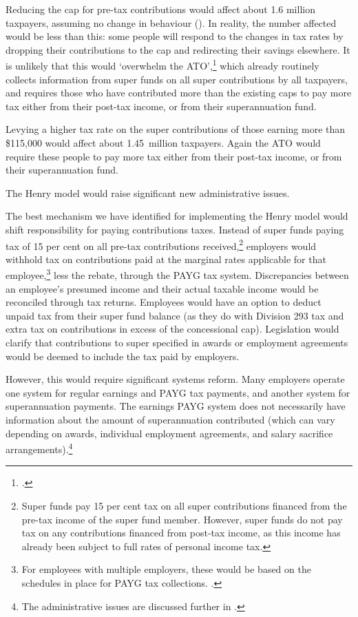 Reducing the cap for pre-tax contributions would affect about 1.6 million taxpayers, assuming no change in behaviour (). In reality, the number affected would be less than this: some people will respond to the changes in tax rates by dropping their contributions to the cap and redirecting their savings elsewhere. It is unlikely that this would ‘overwhelm the ATO’,\footcite{Sloan2015a}  which already routinely collects information from super funds on all super contributions by all taxpayers, and requires those who have contributed more than the existing caps to pay more tax either from their post-tax income, or from their superannuation fund.

Levying a higher tax rate on the super contributions of those earning more than \$115,000 would affect about 1.45~million taxpayers. Again the ATO would require these people to pay more tax either from their post-tax income, or from their superannuation fund.

The Henry model would raise significant new administrative issues.

The best mechanism we have identified for implementing the Henry model would shift responsibility for paying contributions taxes. Instead of super funds paying tax of 15 per cent on all pre-tax contributions received,\footnote{Super funds pay 15 per cent tax on all super contributions financed from the pre-tax income of the super fund member. However, super funds do not pay tax on any contributions financed from post-tax income, as this income has already been subject to full rates of personal income tax. }  employers would withhold tax on contributions paid at the marginal rates applicable for that employee,\footnote{For employees with multiple employers, these would be based on the schedules in place for PAYG tax collections. \textcite{ATO2015WhenYouHaveIncomeFromTwoPayers}.}  less the rebate, through the PAYG tax system. Discrepancies between an employee’s presumed income and their actual taxable income would be reconciled through tax returns. Employees would have an option to deduct unpaid tax from their super fund balance (as they do with Division 293 tax and extra tax on contributions in excess of the concessional cap). Legislation would clarify that contributions to super specified in awards or employment agreements would be deemed to include the tax paid by employers.

However, this would require significant systems reform. Many employers operate one system for regular earnings and PAYG tax payments, and another system for superannuation payments. The earnings PAYG system does not necessarily have information about the amount of superannuation contributed (which can vary depending on awards, individual employment agreements, and salary sacrifice arrangements).\footnote{The administrative issues are discussed further in \textcite{Mercer2015SubmissionToReThink}.} 

